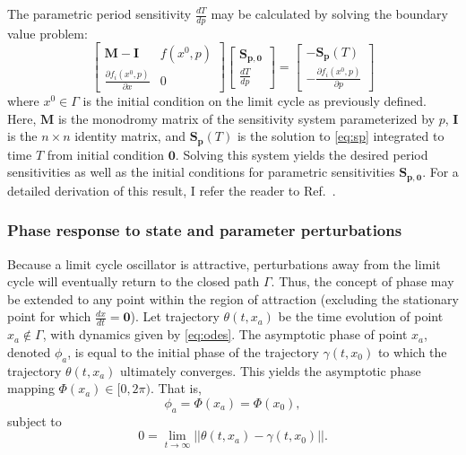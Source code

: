 %
The parametric period sensitivity $\frac{dT}{dp}$ may be calculated by solving the boundary value problem:
\begin{equation}
%
    \begin{bmatrix}
        \mathbf{M} - \mathbf{I} & f(x^0, p) \\[6pt]
        \frac{\partial f_i(x^0, p)}{\partial x} & 0 
    \end{bmatrix}
    \begin{bmatrix}
        \mathbf{S_{p,0}} \\[6pt]
        \frac{dT}{dp}
    \end{bmatrix}
        =
    \begin{bmatrix}
        -\mathbf{S_{p}}(T) \\[6pt]
        -\frac{\partial f_i(x^0, p)}{\partial p}
    \end{bmatrix}
%
\end{equation}
where $x^0\in\Gamma$ is the initial condition on the limit cycle as previously defined.
Here, $\mathbf{M}$ is the monodromy matrix of the sensitivity system parameterized by $p$, $\mathbf{I}$ is the $n\times n$ identity matrix, and $\mathbf{S_p}(T)$ is the solution to \eqref{eq:sp} integrated to time $T$ from initial condition $\mathbf{0}$.
Solving this system yields the desired period sensitivities as well as the initial conditions for parametric sensitivities $\mathbf{S_{p,0}}$.
For a detailed derivation of this result, I refer the reader to Ref.~\cite{Tidor2009}.

\subsubsection*{Phase response to state and parameter perturbations}
Because a limit cycle oscillator is attractive, perturbations away from the limit cycle will eventually return to the closed path $\Gamma$.
Thus, the concept of phase may be extended to any point within the region of attraction (excluding the stationary point for which $\frac{dx}{dt}=\mathbf{0}$).
Let trajectory $\theta(t,x_a)$ be the time evolution of point $x_a\notin\Gamma$, with dynamics given by \eqref{eq:odes}.
The asymptotic phase of point $x_a$, denoted $\phi_a$, is equal to the initial phase of the trajectory $\gamma(t, x_0)$ to which the trajectory $\theta(t,x_a)$ ultimately converges.
This yields the asymptotic phase mapping $\mathit{\Phi}(x_a)\in[0,2\pi)$.
That is, 
\begin{equation}
    \phi_a = \mathit{\Phi}(x_a) = \Phi(x_0),
\end{equation}
subject to
\begin{equation}
    0 = \lim_{t\to\infty}||\theta(t, x_a) - \gamma(t, x_0)||.
\end{equation}

